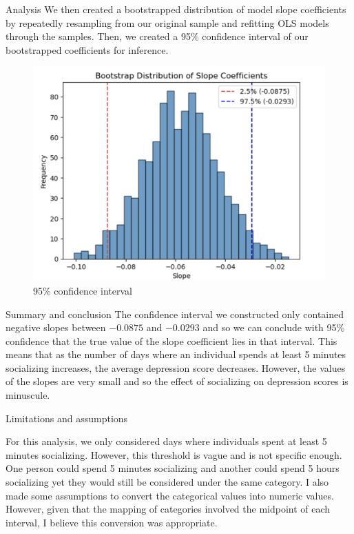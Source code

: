 \documentclass{beamer}
\begin{document}
\begin{frame}{Analysis}
    We then created a bootstrapped distribution of model slope coefficients by repeatedly resampling from our original sample and refitting OLS models through the samples. Then, we created a 95\% confidence interval of our bootstrapped coefficients for inference.
    \begin{figure}
        \centering
        \includegraphics[width=0.5\linewidth]{95CI.png}
        \caption{95\% confidence interval}
        \label{fig:enter-label}
    \end{figure}
\end{frame}

\begin{frame}{Summary and conclusion}
The confidence interval we constructed only contained negative slopes between $-0.0875$ and $-0.0293$ and so we can conclude with 95\% confidence that the true value of the slope coefficient lies in that interval. This means that as the number of days where an individual spends at least 5 minutes socializing increases, the average depression score decreases. However, the values of the slopes are very small and so the effect of socializing on depression scores is minuscule.
    
\end{frame}

\begin{frame}{Limitations and assumptions}

    For this analysis, we only considered days where individuals spent at least 5 minutes socializing. However, this threshold is vague and is not specific enough. One person could spend 5 minutes socializing and another could spend 5 hours socializing yet they would still be considered under the same category. I also made some assumptions to convert the categorical values into numeric values. However, given that the mapping of categories involved the midpoint of each interval, I believe this conversion was appropriate.
    
\end{frame}
\end{document}
